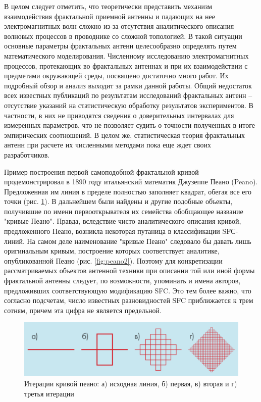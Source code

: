 В целом следует отметить, что теоретически представить механизм взаимодействия фрактальной приемной антенны и падающих на нее электромагнитных волн сложно из-за отсутствия аналитического описания волновых процессов в проводнике со сложной топологией. В такой ситуации основные параметры фрактальных антенн целесообразно определять путем математического моделирования. Численному исследованию электромагнитных процессов, протекающих во фрактальных антеннах и при их взаимодействии с предметами окружающей среды, посвящено достаточно много работ. Их подробный обзор и анализ выходит за рамки данной работы. Общий недостаток всех известных публикаций по результатам исследований фрактальных антенн – отсутствие указаний на статистическую обработку результатов экспериментов. В частности, в них не приводятся сведения о доверительных интервалах для измеренных параметров, что не позволяет судить о точности полученных в итоге эмпирических соотношений. В целом же, статистическая теория фрактальных антенн при расчете их численными методами пока еще ждет своих разработчиков.

Пример построения первой самоподобной фрактальной кривой продемонстрировал в 1890 году итальянский математик Джузеппе Пеано (Peano). Предложенная им линия в пределе полностью заполняет квадрат, обегая все его точки (рис. \ref{fig:peano1}). В дальнейшем были найдены и другие подобные объекты, получившие по имени первооткрывателя их семейства обобщающее название "кривые Пеано". Правда, вследствие чисто аналитического описания кривой, предложенного Пеано, возникла некоторая путаница в классификации SFС-линий. На самом деле наименование "кривые Пеано" следовало бы давать лишь оригинальным кривым, построение которых соответствует аналитике, опубликованной Пеано (рис. \ref{fig:peano2}). Поэтому для конкретизации рассматриваемых объектов антенной техники при описании той или иной формы фрактальной антенны следует, по возможности, упоминать и имена авторов, предложивших соответствующую модификацию SFC. Это тем более важно, что согласно подсчетам, число известных разновидностей SFC приближается к трем сотням, причем эта цифра не является предельной.

\begin{figure}[H]
    \centering
    \includegraphics[width=.9\textwidth]{img/peano1.png}
    \caption{Итерации кривой пеано: а) исходная линия, б) первая, в) вторая и г) третья итерации}
    \label{fig:peano1}
\end{figure}

